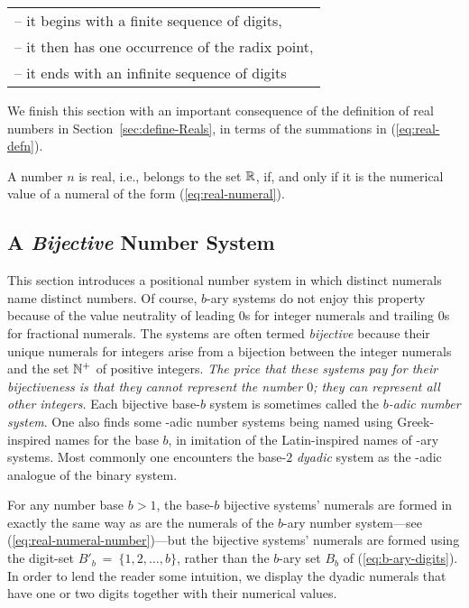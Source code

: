 \hspace*{.15in}
\begin{tabular}{l}
-- it begins with a finite sequence of digits, \\
-- it then has one occurrence of the radix point, \\
-- it ends with an infinite sequence of digits
\end{tabular}

\bigskip

We finish this section with an important consequence of the definition
of real numbers in Section~\ref{sec:define-Reals}, in terms of the
summations in (\ref{eq:real-defn}).

\begin{prop}
\label{thm:define-Reals-via-numerals}
A number $n$ is real, i.e., belongs to the set $\mathbb{R}$, if, and only if
it is the numerical value of a numeral of the form
(\ref{eq:real-numeral}).
\end{prop}

\subsection{A {\em Bijective} Number System}
\label{sec:bijective-adic}

This section introduces a positional number system in which distinct
numerals name distinct numbers.  Of course, $b$-ary systems do not
enjoy this property because of the value neutrality of leading $0$s
for integer numerals and trailing $0$s for fractional numerals.  The
systems are often termed {\it bijective} because their unique numerals
for integers arise from a bijection between the integer numerals and
the set $\mathbb{N}^+$ of positive integers.  {\em The price that these
  systems pay for their bijectiveness is that they cannot represent
  the number $0$; they can represent all other integers.}  Each
bijective base-$b$ system is sometimes called the {\it $b$-adic number
  system}.  One also finds
some -adic number systems being named using Greek-inspired names for
the base $b$, in imitation of the Latin-inspired names of -ary
systems.  Most commonly one encounters the base-$2$ {\it dyadic}
 system as the -adic analogue
of the binary system.

For any number base $b > 1$, the base-$b$ bijective systems' numerals
are formed in exactly the same way as are the numerals of the $b$-ary
number system---see (\ref{eq:real-numeral-number})---but the bijective
systems' numerals are formed using the digit-set $B'_b \ = \ \{1, 2,
\ldots, b\}$, rather than the $b$-ary set $B_b$ of
(\ref{eq:b-ary-digits}).  In order to lend the reader some intuition,
we display the dyadic numerals that have one or two digits together
with their numerical values.


